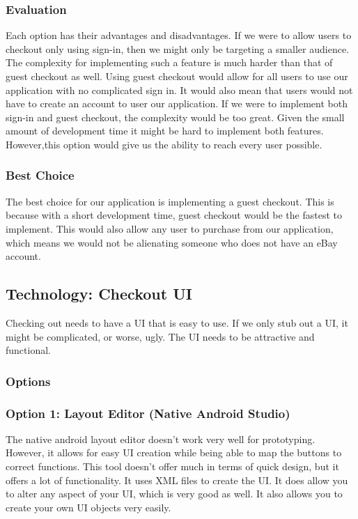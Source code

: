 \documentclass[journal,compsoc, 10pt, draftclsnofoot, onecolumn]{IEEEtran}
\begin{document}
\subsubsection{Evaluation}
Each option has their advantages and disadvantages. If we were to allow users to
 checkout only using sign-in, then we might only be targeting a smaller audience.
 The complexity for implementing such a feature is much harder than that of 
guest checkout as well. Using guest checkout would allow for all users to use our
application with no complicated sign in. It would also mean that users would not 
have to create an account to user our application. If we were to implement both
sign-in and guest checkout, the complexity would be too great. Given the small
amount of development time it might be hard to implement both features. 
However,this option would give us the ability to reach every user possible.

\subsubsection{Best Choice}
The best choice for our application is implementing a guest checkout. This is
because with a short development time, guest checkout would be the fastest to
implement. This would also allow any user to purchase from our application,
which means we would not be alienating someone who does not have an eBay
account.

\subsection{Technology: Checkout UI}
Checking out needs to have a UI that is easy to use. If we only stub out a UI,
it might be complicated, or worse, ugly. The UI needs to be attractive and
functional.

\subsubsection{Options}
\subsubsection*{Option 1: Layout Editor (Native Android Studio)}
The native android layout editor doesn't work very well for prototyping.
However, it allows for easy UI creation while being able to map the buttons to
correct functions. This tool doesn't offer much in terms of quick design, but it
offers a lot of functionality. It uses XML files to create the UI. It does allow
you to alter any aspect of your UI, which is very good as well. It also allows
you to create your own UI objects very easily.
\end{document}

